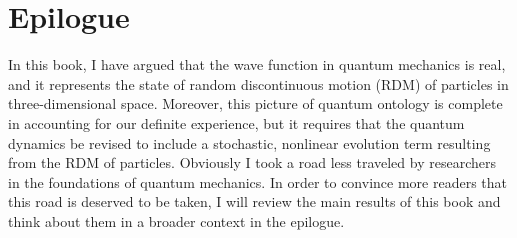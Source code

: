 

\chapter*{Epilogue} %


In this book, I have argued that the wave function in quantum mechanics is real, and it represents the state of random discontinuous motion (RDM) of particles in three-dimensional space. Moreover, this picture of quantum ontology is complete in accounting for our definite experience, but it requires that the quantum dynamics be revised to include a stochastic, nonlinear evolution term resulting from the RDM of particles. 
Obviously I took a road less traveled by researchers in the foundations of quantum mechanics.
In order to convince more readers that this road is deserved to be taken, I will review the main results of this book and think about them in a broader context in the epilogue.




